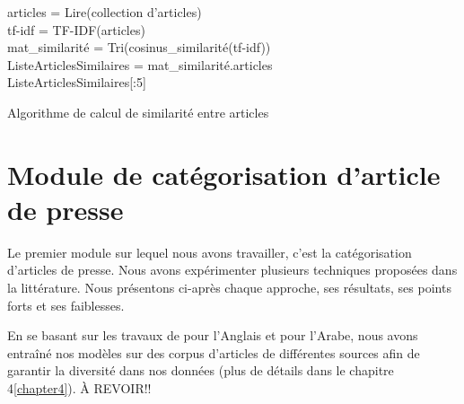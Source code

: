    \begin{algorithm2e}[H]
        \SetAlgoLined
        articles = Lire(collection d'articles)\\
        tf-idf = TF-IDF(articles)\\
        mat\_similarité = Tri(cosinus\_similarité(tf-idf))\\
        ListeArticlesSimilaires = mat\_similarité.articles\\
        \Return ListeArticlesSimilaires[:5]
        \caption{Algorithme de calcul de similarité entre articles}
    \end{algorithm2e}

\section{Module de catégorisation d'article de presse}
Le premier module sur lequel nous avons travailler, c'est la catégorisation d'articles de presse. Nous avons expérimenter plusieurs techniques proposées dans la littérature. Nous présentons ci-après chaque approche, ses résultats, ses points forts et ses faiblesses.

En se basant sur les travaux de \cite{categorisation} pour l'Anglais et \cite{categorisation} pour l'Arabe, nous avons entraîné nos modèles sur des corpus d'articles de différentes sources afin de garantir la diversité dans nos données (plus de détails dans le chapitre 4\ref{chapter4}).
À REVOIR!!

